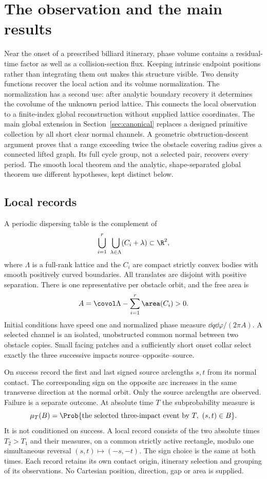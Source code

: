 \section{The observation and the main results}\label{sec:setting}
Near the onset of a prescribed billiard itinerary, phase volume contains
a residual-time factor as well as a collision-section flux. Keeping
intrinsic endpoint positions rather than integrating them out makes
this structure visible. Two density functions recover the local action
and its volume normalization. The normalization has a second use:
after analytic boundary recovery it determines the covolume of the
unknown period lattice. This connects the local observation to a
finite-index global reconstruction without supplied lattice coordinates.
The main global extension in Section~\ref{sec:canonical} replaces a
designed primitive collection by all short clear normal channels. A
geometric obstruction-descent argument proves that a range exceeding
twice the obstacle covering radius gives a connected lifted graph.
Its full cycle group, not a selected pair, recovers every period.
The smooth local theorem and the analytic, shape-separated global
theorem use different hypotheses, kept distinct below.

\subsection{Local records}
A periodic dispersing table is the complement of
\[
             \bigcup_{i=1}^{r}\ \bigcup_{\lambda\in\Lambda}
                         (C_i+\lambda)\subset\R^2,
\]
where $\Lambda$ is a full-rank lattice and the $C_i$ are compact strictly
convex bodies with smooth positively curved boundaries. All translates
are disjoint with positive separation. There is one representative per
obstacle orbit, and the free area is
\begin{equation}\label{eq:volume}
             A=\covol\Lambda-\sum_{i=1}^r\area(C_i)>0.
\end{equation}
Initial conditions have speed one and normalized phase measure
$\dd q\dd\varphi/(2\pi A)$. A selected channel is an isolated,
unobstructed common normal between two obstacle copies. Small facing
patches and a sufficiently short onset collar select exactly the three
successive impacts source--opposite--source.

On success record the first and last signed source arclengths $s,t$
from its normal contact. The corresponding sign on the opposite arc
increases in the same transverse direction at the normal orbit.
Only the source arclengths are observed. Failure is a separate outcome.
At absolute time $T$ the subprobability measure is
\[
 \mu_T(B)=\Prob\{\text{the selected three-impact event by }T,
                                      \ (s,t)\in B\}.
\]
It is not conditioned on success. A local record consists of the two
absolute times $T_2>T_1$ and their measures, on a common strictly active
rectangle, modulo one simultaneous reversal $(s,t)\mapsto(-s,-t)$.
The sign choice is the same at both times. Each record retains its own
contact origin, itinerary selection and grouping of its observations.
No Cartesian position, direction, gap or area is supplied.


